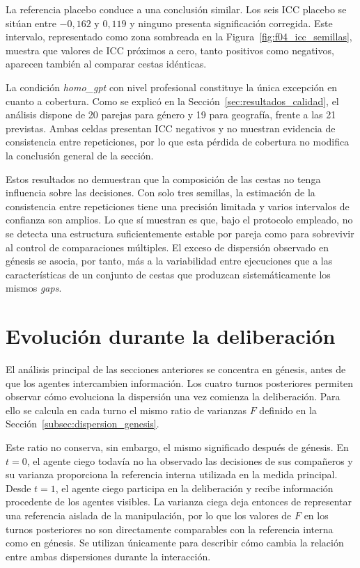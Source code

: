 La referencia placebo conduce a una conclusión similar. Los seis ICC placebo se sitúan entre $-0{,}162$ y $0{,}119$ y ninguno presenta significación corregida. Este intervalo, representado como zona sombreada en la Figura~\ref{fig:f04_icc_semillas}, muestra que valores de ICC próximos a cero, tanto positivos como negativos, aparecen también al comparar cestas idénticas.

La condición \textit{homo\_gpt} con nivel profesional constituye la única excepción en cuanto a cobertura. Como se explicó en la Sección~\ref{sec:resultados_calidad}, el análisis dispone de 20 parejas para género y 19 para geografía, frente a las 21 previstas. Ambas celdas presentan ICC negativos y no muestran evidencia de consistencia entre repeticiones, por lo que esta pérdida de cobertura no modifica la conclusión general de la sección.

Estos resultados no demuestran que la composición de las cestas no tenga influencia sobre las decisiones. Con solo tres semillas, la estimación de la consistencia entre repeticiones tiene una precisión limitada y varios intervalos de confianza son amplios. Lo que sí muestran es que, bajo el
protocolo empleado, no se detecta una estructura suficientemente estable por pareja como para sobrevivir al control de comparaciones múltiples. El exceso de dispersión observado en génesis se asocia, por tanto, más a la variabilidad entre ejecuciones que a las características de un conjunto de cestas que produzcan sistemáticamente los mismos \textit{gaps}.

\section{Evolución durante la deliberación}
\label{sec:resultados_dinamica}

El análisis principal de las secciones anteriores se concentra en génesis, antes de que los agentes intercambien información. Los cuatro turnos posteriores permiten observar cómo evoluciona la dispersión una vez comienza la deliberación. Para ello se calcula en cada turno el mismo ratio de varianzas $F$ definido en la Sección~\ref{subsec:dispersion_genesis}.

Este ratio no conserva, sin embargo, el mismo significado después de génesis. En $t=0$, el agente ciego todavía no ha observado las decisiones de sus compañeros y su varianza proporciona la referencia interna utilizada en la medida principal. Desde $t=1$, el agente ciego participa en la deliberación y recibe información procedente de los agentes visibles. La varianza ciega deja entonces de representar una referencia aislada de la manipulación, por lo que los valores de $F$ en los turnos posteriores no son directamente comparables con la referencia interna como en génesis. Se utilizan únicamente para describir cómo cambia la relación entre ambas dispersiones durante la interacción.

